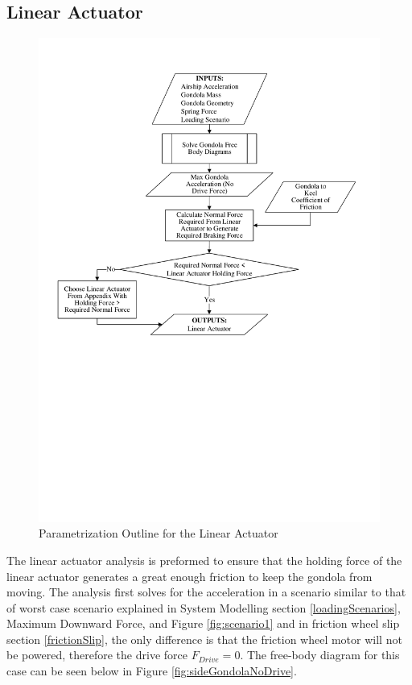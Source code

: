 \documentclass[../main.tex]{subfiles}
\begin{document}
\subsection{Linear Actuator} 
\label{linearActuator}
\begin{figure}[H]
	\centering
	\includegraphics[width=\linewidth]{img/paramaterization/linearActuator.pdf}
	\caption{Parametrization Outline for the Linear Actuator}
	\label{fig:linearActuatorParametrization}
\end{figure}

The linear actuator analysis is preformed to ensure that the holding force of the linear actuator generates a great enough friction to keep the gondola from moving. The analysis first solves for the acceleration in a scenario similar to that of worst case scenario explained in System Modelling section \ref{loadingScenarios}, Maximum Downward Force, and Figure \ref{fig:scenario1} and in friction wheel slip section \ref{frictionSlip}, the only difference is that the friction wheel motor will not be powered, therefore the drive force $F_{Drive} = 0$. The free-body diagram for this case can be seen below in Figure \ref{fig:sideGondolaNoDrive}.
\end{document}
